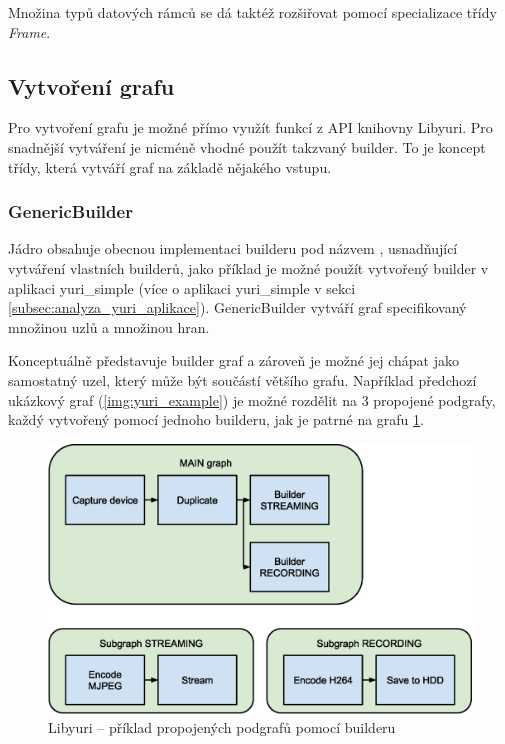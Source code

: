 \documentclass[thesis=M,czech]{FITthesis}[2012/06/26]
\begin{document}
Množina typů datových rámců se dá taktéž rozšiřovat pomocí specializace třídy \textit{Frame}.

\subsection{Vytvoření grafu} \label{subsec:analyza_yuri_vytvoreni}
Pro vytvoření grafu je možné přímo využít funkcí z API knihovny Libyuri. Pro snadnější vytváření je nicméně vhodné použít takzvaný builder. To je koncept třídy, která vytváří graf na základě nějakého vstupu. 

\subsubsection{GenericBuilder} \label{subsec:analyza_yuri_vytvoreni_generic}
Jádro obsahuje obecnou implementaci builderu pod názvem , usnadňující vytváření vlastních builderů, jako příklad je možné použít vytvořený builder  v aplikaci yuri\_simple (více o aplikaci yuri\_simple v sekci \ref{subsec:analyza_yuri_aplikace}). GenericBuilder vytváří graf specifikovaný množinou uzlů a množinou hran.

Konceptuálně představuje builder graf a zároveň je možné jej chápat jako samostatný uzel, který může být součástí většího grafu. Například předchozí ukázkový graf (\ref{img:yuri_example}) je možné rozdělit na 3 propojené podgrafy, každý vytvořený pomocí jednoho builderu, jak je patrné na grafu \ref{img:yuri_subgraph}.
\\
\begin{figure}[h]\centering
	\includegraphics[width=1\textwidth]{images/yuri_subgraph.eps}
	\caption{Libyuri -- příklad propojených podgrafů pomocí builderu}\label{img:yuri_subgraph}
\end{figure}
\end{document}
